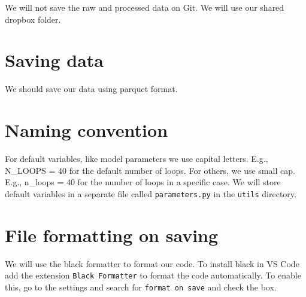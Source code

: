 \documentclass[
  letterpaper,
  DIV=11,
  numbers=noendperiod]{scrartcl}
\begin{document}
We will not save the raw and processed data on Git. We will use our
shared dropbox folder.

\hypertarget{saving-data}{%
\section{Saving data}\label{saving-data}}

We should save our data using parquet format.

\hypertarget{naming-convention}{%
\section{Naming convention}\label{naming-convention}}

For default variables, like model parameters we use capital letters.
E.g., N\_LOOPS = 40 for the default number of loops. For others, we use
small cap. E.g., n\_loops = 40 for the number of loops in a specific
case. We will store default variables in a separate file called
\texttt{parameters.py} in the \texttt{utils} directory.

\hypertarget{file-formatting-on-saving}{%
\section{File formatting on saving}\label{file-formatting-on-saving}}

We will use the black formatter to format our code. To install black in
VS Code add the extension \texttt{Black\ Formatter} to format the code
automatically. To enable this, go to the settings and search for
\texttt{format\ on\ save} and check the box.
\end{document}
